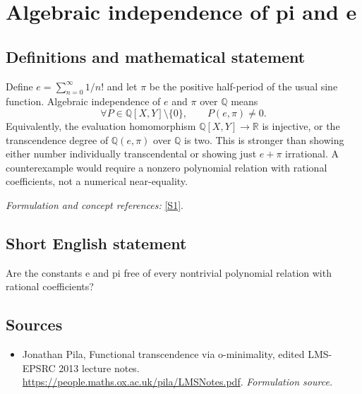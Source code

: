 \documentclass[11pt]{article}
\begin{document}
\section*{\texorpdfstring{Algebraic independence of pi and e}{Algebraic independence of pi and e}}\label{statement}
\subsection{Definitions and mathematical statement}
Define $e=\sum_{n=0}^{\infty}1/n!$ and let $\pi$ be the positive half-period of the usual sine function. Algebraic independence of $e$ and $\pi$ over ${\mathbb{Q}}$ means
\[
 \forall P\in{\mathbb{Q}}[X,Y]\setminus\{0\},\qquad P(e,\pi)\ne0.
\]
Equivalently, the evaluation homomorphism ${\mathbb{Q}}[X,Y]\to{\mathbb{R}}$ is injective, or the transcendence degree of ${\mathbb{Q}}(e,\pi)$ over ${\mathbb{Q}}$ is two. This is stronger than showing either number individually transcendental or showing just $e+\pi$ irrational. A counterexample would require a nonzero polynomial relation with rational coefficients, not a numerical near-equality.
\par\smallskip\textit{Formulation and concept references:} \href{https://people.maths.ox.ac.uk/pila/LMSNotes.pdf}{[S1]}.

\subsection{Short English statement}
Are the constants e and pi free of every nontrivial polynomial relation with rational coefficients?
\subsection{Sources}
\begin{itemize}
\item[S1]Jonathan Pila, Functional transcendence via o-minimality, edited LMS-EPSRC 2013 lecture notes.
\url{https://people.maths.ox.ac.uk/pila/LMSNotes.pdf}.
\textit{Formulation source.}
\end{itemize}
\end{document}
